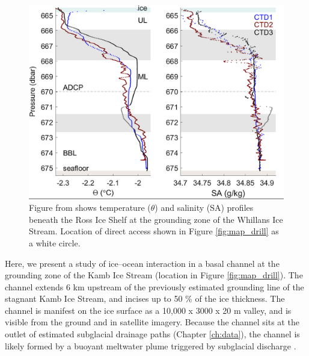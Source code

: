 \begin{figure}[!ht]
\centering
    \includegraphics[width=1\textwidth]{chapters/4/oceanobs1.png}
    \caption[Whillans observations]{Figure from \cite{begeman2018ocean} shows temperature ($\theta$) and salinity (SA) profiles beneath the Ross Ice Shelf at the grounding zone of the Whillans Ice Stream. Location of direct access shown in Figure \ref{fig:map_drill} as a white circle.}
    \label{fig:oceanobs1}
\end{figure}

Here, we present a study of ice--ocean interaction in a basal channel at the grounding zone of the Kamb Ice Stream (location in Figure \ref{fig:map_drill}). 
The channel extends 6 km upstream of the previously estimated grounding line of the stagnant Kamb Ice Stream, and incises up to 50 \% of the ice thickness. The channel is manifest on the ice surface as a  10,000 x 3000 x 20 m valley, and is visible from the ground and in satellite imagery. Because the channel sits at the outlet of estimated subglacial drainage paths (Chapter \ref{ch:data}), the channel is likely formed by a buoyant meltwater plume triggered by subglacial discharge \citep{kim2016active, alley2016impacts}.

